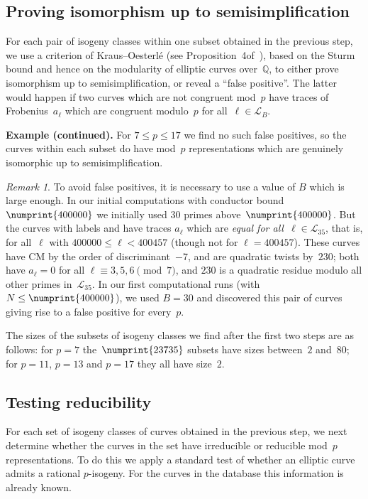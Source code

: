 \documentclass[twoside,leqno,symbols-for-thanks, draft]{rmi}
\numberwithin{equation}{section}
\newcommand{\lmfdbec}[3]{\href{http://www.lmfdb.org/EllipticCurve/Q/#1#2#3}{{\text{\rm#1#2#3}}}}
\newcommand{\Q}{\mathbb{Q}}
\newcommand{\calL}{\mathcal{L}}
\theoremstyle{remark}
\newtheorem{remark}[theorem]{Remark}
\begin{document}
\subsection{Proving isomorphism up to semisimplification}

For each pair of isogeny classes within one subset obtained in the
previous step, we use a criterion of Kraus--Oesterl\'e (see
Proposition~4of~\cite{KO}), based on the Sturm bound and hence on the
modularity of elliptic curves over~$\Q$, to either prove isomorphism
up to semisimplification, or reveal a ``false positive''.  The latter
would happen if two curves which are not congruent mod~$p$ have traces
of Frobenius~$a_{\ell}$ which are congruent modulo~$p$ for
all~$\ell\in\calL_B$.

{\bf Example (continued).}  For $7\le p\le17$ we find no such false
positives, so the curves within each subset do have mod~$p$
representations which are genuinely isomorphic up to
semisimplification.

\begin{remark}
  To avoid false positives, it is necessary to use a value of $B$
  which is large enough.  In our initial computations with conductor
  bound~$\numprint{400000}$ we initially used 30 primes
  above~$\numprint{400000}$. But the curves with labels
  \lmfdbec{25921}{a}{1} and \lmfdbec{78400}{gw}{1} have traces
  $a_{\ell}$ which are \emph{equal for all~$\ell\in\calL_{35}$}, that
  is, for all~$\ell$ with $400000\le \ell<400457$ (though not for
  $\ell=400457$).  These curves have CM by the order of
  discriminant~$-7$, and are quadratic twists by~$230$; both have
  $a_\ell=0$ for all $\ell\equiv3,5,6\pmod{7}$, and $230$ is a
  quadratic residue modulo all other primes in~$\calL_{35}$. In our
  first computational runs (with $N\le\numprint{400000}$), we used
  $B=30$ and discovered this pair of curves giving rise to a false
  positive for every~$p$.
\end{remark}

The sizes of the subsets of isogeny classes we find after the first
two steps are as follows: for $p=7$ the~$\numprint{23735}$ subsets
have sizes between~$2$ and~$80$; for $p=11$, $p=13$ and $p=17$ they
all have size~$2$.

\subsection{Testing reducibility}
For each set of isogeny classes of curves obtained in the previous
step, we next determine whether the curves in the set have irreducible
or reducible mod~$p$ representations.  To do this we apply a standard
test of whether an elliptic curve admits a rational $p$-isogeny.  For
the curves in the database this information is already known.
\end{document}
